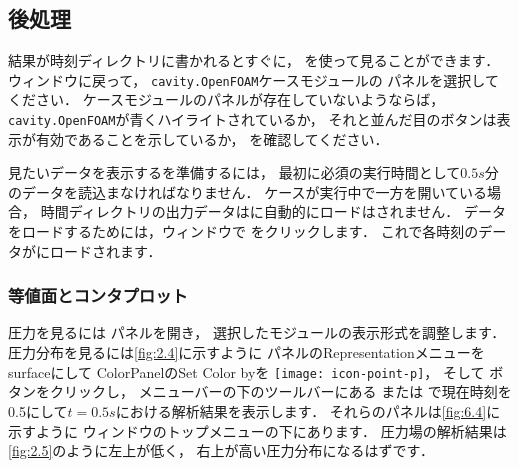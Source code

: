 \subsection{後処理}
\label{ssec:2.1.4}
結果が時刻ディレクトリに書かれるとすぐに，
を使って見ることができます．
ウィンドウに戻って，
\texttt{cavity.OpenFOAM}ケースモジュールの
%
%
パネルを選択してください．
ケースモジュールのパネルが存在していないようならば，
\texttt{cavity.OpenFOAM}が青くハイライトされているか，
それと並んだ目のボタンは表示が有効であることを示しているか，
を確認してください．

見たいデータを表示するを準備するには，
最初に必須の実行時間として$0.5\unit{s}$分のデータを読込まなければなりません．
ケースが実行中で一方を開いている場合，
時間ディレクトリの出力データはに自動的にロードはされません．
データをロードするためには，ウィンドウで
%
%
をクリックします．
これで各時刻のデータがにロードされます．

\subsubsection{等値面とコンタプロット}
\label{sssec:2.1.4.1}
圧力を見るには
%
%
パネルを開き，
選択したモジュールの表示形式を調整します．
圧力分布を見るには\autoref{fig:2.4}に示すように
パネルのRepresentationメニューをsurfaceにして
ColorPanelのSet Color byを \texttt{[image: icon-point-p]}，
そして
%
%
ボタンをクリックし，
メニューバーの下のツールバーにある
%
%
または
%
%
で現在時刻を0.5にして$t = 0.5\unit{s}$における解析結果を表示します．
それらのパネルは\autoref{fig:6.4}に示すように
ウィンドウのトップメニューの下にあります．
圧力場の解析結果は\autoref{fig:2.5}のように左上が低く，
右上が高い圧力分布になるはずです．

